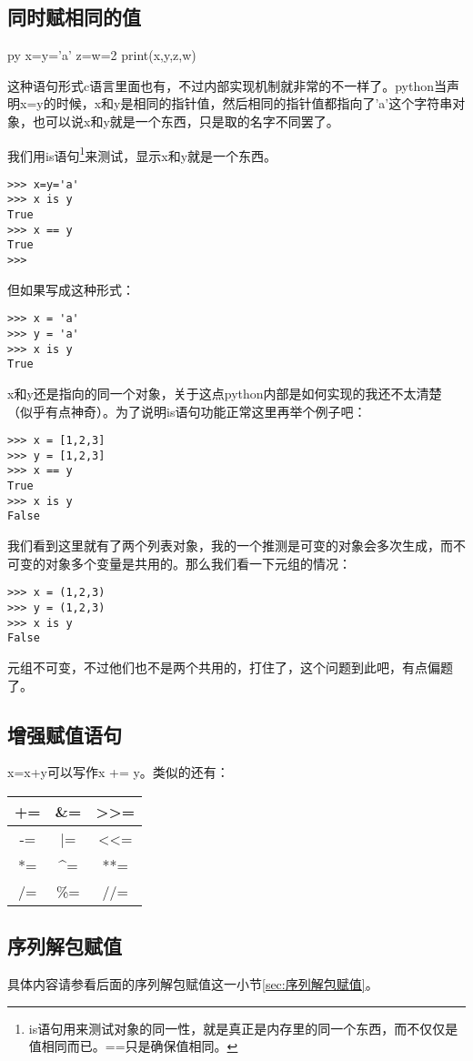 \documentclass[12pt,oneside]{book}
\begin{document}
\begin{common-format}
\subsection{同时赋相同的值}
\begin{xverbatim}[129]{py}
x=y='a'
z=w=2
print(x,y,z,w)
\end{xverbatim}

这种语句形式c语言里面也有，不过内部实现机制就非常的不一样了。python当声明x=y的时候，x和y是相同的指针值，然后相同的指针值都指向了'a'这个字符串对象，也可以说x和y就是一个东西，只是取的名字不同罢了。

我们用is语句\footnote{is语句用来测试对象的同一性，就是真正是内存里的同一个东西，而不仅仅是值相同而已。==只是确保值相同。}来测试，显示x和y就是一个东西。
\begin{Verbatim}
>>> x=y='a'
>>> x is y
True
>>> x == y
True
>>> 
\end{Verbatim}


但如果写成这种形式：
\begin{Verbatim}
>>> x = 'a'
>>> y = 'a'
>>> x is y
True
\end{Verbatim}
x和y还是指向的同一个对象，关于这点python内部是如何实现的我还不太清楚（似乎有点神奇）。为了说明is语句功能正常这里再举个例子吧：
\begin{Verbatim}
>>> x = [1,2,3]
>>> y = [1,2,3]
>>> x == y
True
>>> x is y
False
\end{Verbatim}
我们看到这里就有了两个列表对象，我的一个推测是可变的对象会多次生成，而不可变的对象多个变量是共用的。那么我们看一下元组的情况：
\begin{Verbatim}
>>> x = (1,2,3)
>>> y = (1,2,3)
>>> x is y
False
\end{Verbatim}
元组不可变，不过他们也不是两个共用的，打住了，这个问题到此吧，有点偏题了。



\subsection{增强赋值语句}
x=x+y可以写作x += y。类似的还有：
\begin{tabular}{|c|c|c|}
\hline 
+= & \&{}= & >>= \\ 
\hline 
-= & |= & <<= \\ 
\hline 
*= & \^{}= & **= \\ 
\hline 
/= & \%{}= & //= \\ 
\hline 
\end{tabular} 

\subsection{序列解包赋值}
具体内容请参看后面的序列解包赋值这一小节\ref{sec:序列解包赋值}。


\end{common-format}
\end{document}
